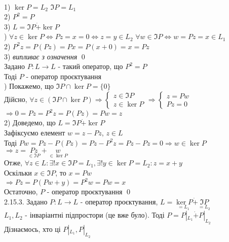 \documentclass[a4paper, 10pt]{article}
\theoremstyle{theoremdd}
\begin{document}
\\
1) $\ker P = L_2$ \hspace{1cm} $\Im P = L_1$\\
2) $P^2 = P$\\
3) $L = \Im P \dot{+} \ker P$\\
) $\forall z \in \ker P \iff Pz = x = 0 \iff z = y \in L_2$
$\forall w \in \Im P \iff w = Pz = x \in L_1$
\bigskip \\
2) $P^2z = P(Pz) = Px = P(x+0)=x=Pz$
\bigskip \\
3) \textit{випливає з означення} \qed
\bigskip \\
 Задано $P: L \to L$ - такий оператор, що $P^2 = P$\\
Тоді $P$ - оператор проєктування\\
) Покажемо, що $\Im P \cap \ker P = \{0\}$\\
Дійсно, $\forall z \in (\Im P \cap \ker P) \Rightarrow \begin{cases} z \in \Im P \\ z \in \ker P \end{cases} \Rightarrow \begin{cases} z = Pw \\ Pz = 0 \end{cases}$\\
$\Rightarrow 0 = Pz = P^2z = P(Pz) = Pw = z$
\bigskip \\
2) Доведемо, що $L = \Im P \dot{+} \ker P$\\
Зафіксуємо елемент $w = z - Pz$, $z \in L$\\
Тоді $Pw = Pz - P(Pz) = Pz - P^2z = Pz - Pz = 0 \Rightarrow w \in \ker P$\\
$\Rightarrow z = \underset{\in \Im P}{Pz} + \underset{\in \ker P}{w}$\\
Отже, $\forall z \in L: \exists! x \in \Im P = L_1, \exists! y \in \ker P = L_2: z = x+y$\\
Оскільки $x \in \Im P$, то $x = Pw$\\
$\Rightarrow Pz = P(Pw+y) = P^2 w = Pw = x$\\
Остаточно, $P$ - оператор проєктування \qed
\bigskip \\
\rm{2.15.3.} Задано $P: L \to L$ - оператор проєктування, $L = \underset{=L_1}{\ker P} \dot{+} \underset{=L_2}{\Im P}$\\
$L_1,L_2$ - інваріантні підпростори (це вже було). Тоді $P = P|_{L_1} \dot{+} P|_{L_2}$\\
Дізнаємось, хто ці $P|_{L_1}, P|_{L_2}$\\
\end{document}
